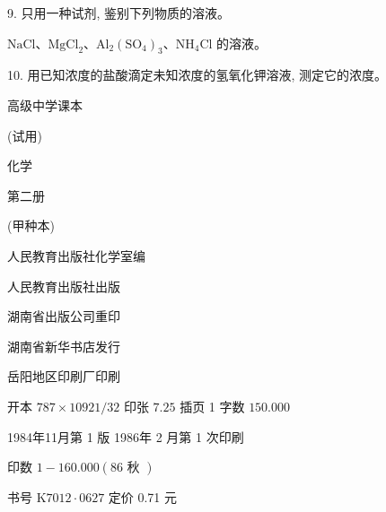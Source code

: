 \documentclass[10pt]{article}
\begin{document}
9. 只用一种试剂, 鉴别下列物质的溶液。

\(\mathrm{{NaCl}}\text{、}{\mathrm{{MgCl}}}_{2}\text{、}{\mathrm{{Al}}}_{2}{\left( {\mathrm{{SO}}}_{4}\right) }_{3}\text{、}{\mathrm{{NH}}}_{4}\mathrm{{Cl}}\) 的溶液。

10. 用已知浓度的盐酸滴定未知浓度的氢氧化钾溶液, 测定它的浓度。

高级中学课本

(试用)

化学

第二册

(甲种本)

人民教育出版社化学室编

人民教育出版社出版

湖南省出版公司重印

湖南省新华书店发行

岳阳地区印刷厂印刷

开本 \({787} \times {10921}/{32}\) 印张 \({7.25}\) 插页 1 字数 \({150.000}\)

1984年11月第 1 版 1986年 2 月第 1 次印刷

印数 \(1 - {160.000}\left( {{86}\text{ 秋 }}\right)\)

书号 \(\mathrm{K}{7012} \cdot {0627}\) 定价 0.71 元
\end{document}
